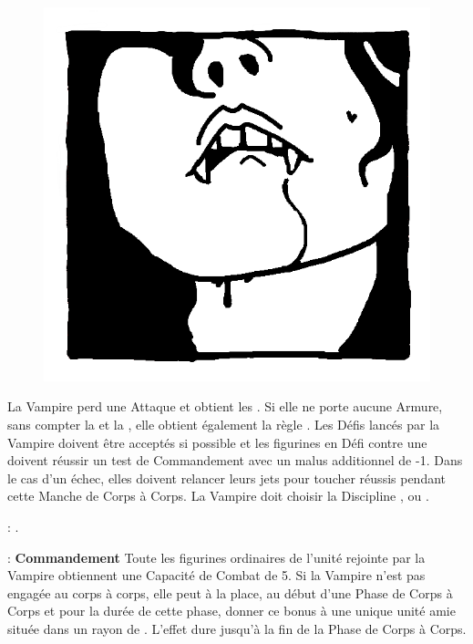 \newpage
{}

\begin{figure}
\centering
\includegraphics[width=\logosize]{logos/logo_lamia.png}
\end{figure}
La Vampire perd une Attaque et obtient les \lightningreflexes{}. Si elle ne porte aucune Armure, sans compter la \mountsprotection{} et la \innatedefence{}, elle obtient également la règle \distracting{}. Les Défis lancés par la Vampire doivent être acceptés si possible et les figurines en Défi contre une \lamia{} doivent réussir un test de Commandement avec un malus additionnel de -1. Dans le cas d'un échec, elles doivent relancer leurs jets pour toucher réussis pendant cette Manche de Corps à Corps. La Vampire doit choisir la Discipline \light{}, \shadows{} ou \necromancy{}.

\vspace{0.5cm}
\bloodties{} : \textbf{\courtofthedamned{}}.

\vspace{0.5cm}
\ancientbloodpower{} : \textbf{Commandement}\dotfill{}\newline%
Toute les figurines ordinaires de l'unité rejointe par la Vampire obtiennent une Capacité de Combat de 5. Si la Vampire n'est pas engagée au corps à corps, elle peut à la place, au début d'une Phase de Corps à Corps et pour la durée de cette phase, donner ce bonus à une unique unité amie située dans un rayon de . L'effet dure jusqu'à la fin de la Phase de Corps à Corps.


